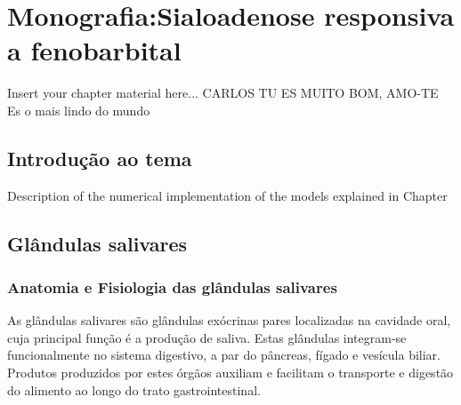 
\chapter{Monografia:Sialoadenose responsiva a fenobarbital}
\label{chapter:Monografia:Sialoadenose responsiva a fenobarbital}

Insert your chapter material here... CARLOS TU ES MUITO BOM, AMO-TE
Es o mais lindo do mundo 
\section{Introdução ao tema}
\label{section:Introdução ao tema}

Description of the numerical implementation of the models explained in Chapter

\section{Glândulas salivares}
\label{section:Glândulas salivares}

\subsection{Anatomia e Fisiologia das glândulas salivares}

As glândulas salivares são glândulas exócrinas pares localizadas na cavidade oral, cuja principal função é a produção de saliva. \cite{Mescher2018}Estas glândulas integram-se funcionalmente no sistema digestivo, a par do pâncreas, fígado e vesícula biliar. \cite{Mescher2018} Produtos produzidos por estes órgãos auxiliam e facilitam o transporte e digestão do alimento ao longo do trato gastrointestinal. \cite{Mescher2018}

